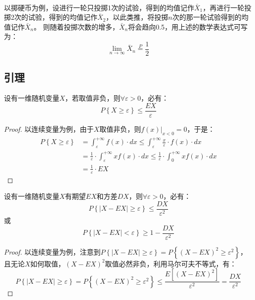~

以掷硬币为例，设进行一轮只投掷1次的试验，得到的均值记作$\bar{X}_1$，再进行一轮投掷2次的试验，得到的均值记作$\bar{X}_2$，以此类推，将投掷$n$次的那一轮试验得到的均值记作$\bar{X}_n$。
则随着投掷次数的增多，$\bar{X}_n$将会趋向0.5，用上述的数学表达式可写为：
\[
\underset{n\rightarrow \infty}{\lim}\bar{X}_n\overset{P}{=}\frac{1}{2}
\]

\subsection{引理}

\begin{lemma}[马尔可夫不等式]
设有一维随机变量$X$，若取值非负，则$\forall \varepsilon >0$，必有：
\[
P\left\{ X\geqslant \varepsilon \right\} \leqslant \frac{EX}{\varepsilon}
\]
\end{lemma}

\begin{proof}
以连续变量为例，由于$X$取值非负，则$\left. f\left( x \right) \right|_{x<0}=0$，于是：
\begin{align*}
P\left\{ X\geqslant \varepsilon \right\} &=\int_{\varepsilon}^{+\infty}{f\left( x \right) \cdot dx}\leqslant \int_{\varepsilon}^{+\infty}{\frac{x}{\varepsilon}\cdot f\left( x \right) \cdot dx} \\
&=\frac{1}{\varepsilon}\cdot \int_{\varepsilon}^{+\infty}{xf\left( x \right) \cdot dx}\leqslant \frac{1}{\varepsilon}\cdot \int_0^{+\infty}{xf\left( x \right) \cdot dx} \\
&=\frac{1}{\varepsilon}\cdot EX
\end{align*}
\end{proof}

\begin{lemma}[切比雪夫不等式]
设有一维随机变量$X$有期望$EX$和方差$DX$，则$\forall \varepsilon >0$，必有：
\[
P\left\{ \left| X-EX \right|\geqslant \varepsilon \right\} \leqslant \frac{DX}{\varepsilon ^2}
\]
或
\[
P\left\{ \left| X-EX \right|<\varepsilon \right\} \geqslant 1-\frac{DX}{\varepsilon ^2}
\]
\end{lemma}

\begin{proof}
以连续变量为例，注意到$P\left\{ \left| X-EX \right|\geqslant \varepsilon \right\} =P\left\{ \left( X-EX \right) ^2\geqslant \varepsilon ^2 \right\} $，且无论$X$如何取值，$\left( X-EX \right) ^2$取值必然非负，利用马尔可夫不等式，有：
\[
P\left\{ \left| X-EX \right|\geqslant \varepsilon \right\} =P\left\{ \left( X-EX \right) ^2\geqslant \varepsilon ^2 \right\} \leqslant \frac{E\left[ \left( X-EX \right) ^2 \right]}{\varepsilon ^2}=\frac{DX}{\varepsilon ^2}
\]
\end{proof}


